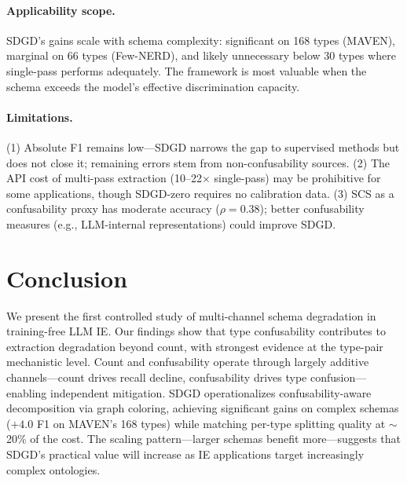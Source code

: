 \documentclass[11pt,a4paper]{article}
\begin{document}
\paragraph{Applicability scope.}
SDGD's gains scale with schema complexity: significant on 168 types (MAVEN), marginal on 66 types (Few-NERD), and likely unnecessary below 30 types where single-pass performs adequately. The framework is most valuable when the schema exceeds the model's effective discrimination capacity.

\paragraph{Limitations.}
(1) Absolute F1 remains low---SDGD narrows the gap to supervised methods but does not close it; remaining errors stem from non-confusability sources.
(2) The API cost of multi-pass extraction (10--22$\times$ single-pass) may be prohibitive for some applications, though SDGD-zero requires no calibration data.
(3) SCS as a confusability proxy has moderate accuracy ($\rho=0.38$); better confusability measures (e.g., LLM-internal representations) could improve SDGD.

\section{Conclusion}
\label{sec:conclusion}

We present the first controlled study of multi-channel schema degradation in training-free LLM IE. Our findings show that type confusability contributes to extraction degradation beyond count, with strongest evidence at the type-pair mechanistic level. Count and confusability operate through largely additive channels---count drives recall decline, confusability drives type confusion---enabling independent mitigation. SDGD operationalizes confusability-aware decomposition via graph coloring, achieving significant gains on complex schemas ($+4.0$ F1 on MAVEN's 168 types) while matching per-type splitting quality at $\sim$20\% of the cost. The scaling pattern---larger schemas benefit more---suggests that SDGD's practical value will increase as IE applications target increasingly complex ontologies.


\end{document}
